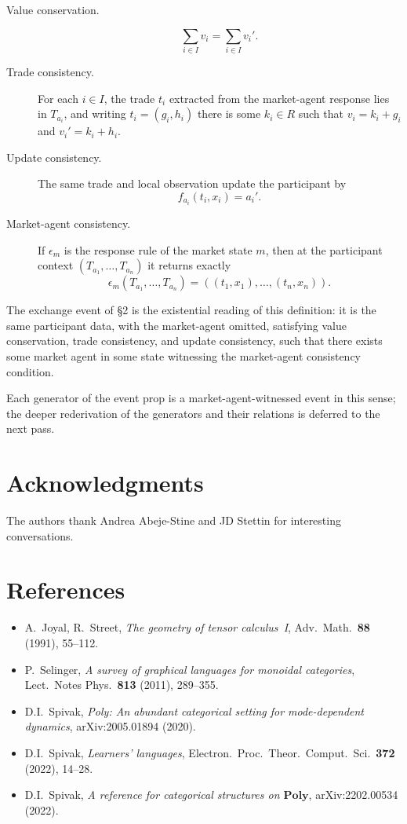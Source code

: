 \documentclass[11pt, one side, article]{memoir}
\theoremstyle{definition}
\theoremstyle{plain}
\newcommand{\0}{\textsf{0}}
\newcommand{\1}{\tn{\textsf{1}}}
\begin{document}
\begin{description}
  \item[\quad Value conservation.]
  \[
    \sum_{i\in I} v_i=\sum_{i\in I} v_i'.
  \]

  \item[\quad Trade consistency.]
  For each $i\in I$, the trade $t_i$ extracted from the market-agent response lies in $T_{a_i}$, and writing $t_i=(g_i,h_i)$ there is some $k_i\in R$ such that $v_i=k_i+g_i$ and $v_i'=k_i+h_i$.

  \item[\quad Update consistency.]
  The same trade and local observation update the participant by
  \[
    f_{a_i}(t_i,x_i)=a_i'.
  \]

  \item[\quad Market-agent consistency.]
  If $\epsilon_m$ is the response rule of the market state $m$, then at the participant context $(T_{a_1},\ldots,T_{a_n})$ it returns exactly
  \[
    \epsilon_m(T_{a_1},\ldots,T_{a_n})
    =
    ((t_1,x_1),\ldots,(t_n,x_n)).
  \]
\end{description}

The exchange event of \S2 is the existential reading of this definition: it is the same participant data, with the market-agent omitted, satisfying value conservation, trade consistency, and update consistency, such that there exists some market agent in some state witnessing the market-agent consistency condition.

Each generator of the event prop is a market-agent-witnessed event in this sense; the deeper rederivation of the generators and their relations is deferred to the next pass.

\section*{Acknowledgments}
The authors thank Andrea Abeje-Stine and JD Stettin for interesting conversations.

\section*{References}
\begin{itemize}[leftmargin=*]
\item A.\ Joyal, R.\ Street, \emph{The geometry of tensor calculus~I}, Adv.\ Math.\ \textbf{88} (1991), 55--112.
\item P.\ Selinger, \emph{A survey of graphical languages for monoidal categories}, Lect.\ Notes Phys.\ \textbf{813} (2011), 289--355.
\item D.I.\ Spivak, \emph{Poly: An abundant categorical setting for mode-dependent dynamics}, arXiv:2005.01894 (2020).
\item D.I.\ Spivak, \emph{Learners' languages}, Electron.\ Proc.\ Theor.\ Comput.\ Sci.\ \textbf{372} (2022), 14--28.
\item D.I.\ Spivak, \emph{A reference for categorical structures on $\mathbf{Poly}$}, arXiv:2202.00534 (2022).
\end{itemize}
\end{document}
